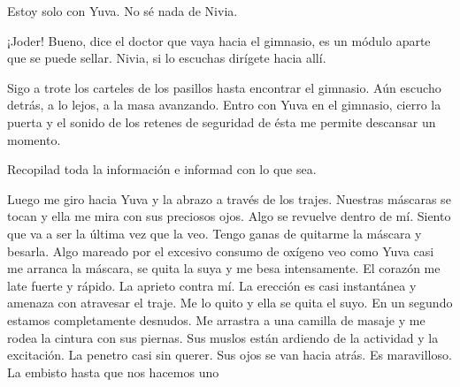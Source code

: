 \reply Estoy solo con Yuva. No sé nada de Nivia.

\reply ¡Joder\textellipsis! Bueno, dice el doctor que vaya hacia el gimnasio, es un módulo aparte que se puede sellar. Nivia, si lo escuchas dirígete hacia allí.

Sigo a trote los carteles de los pasillos hasta encontrar el gimnasio. Aún escucho detrás, a lo lejos, a la masa avanzando. Entro con Yuva en el gimnasio, cierro la puerta y el sonido de los retenes de seguridad de ésta me permite descansar un momento.

\reply Recopilad toda la información e informad con lo que sea.

Luego me giro hacia Yuva y la abrazo a través de los trajes. Nuestras máscaras se tocan y ella me mira con sus preciosos ojos. Algo se revuelve dentro de mí. Siento que va a ser la última vez que la veo. Tengo ganas de quitarme la máscara y besarla. Algo mareado por el excesivo consumo de oxígeno veo como Yuva casi me arranca la máscara, se quita la suya y me besa intensamente. El corazón me late fuerte y rápido. La aprieto contra mí. La erección es casi instantánea y amenaza con atravesar el traje. Me lo quito y ella se quita el suyo. En un segundo estamos completamente desnudos. Me arrastra a una camilla de masaje y me rodea la cintura con sus piernas. Sus muslos están ardiendo de la actividad y la excitación. La penetro casi sin querer. Sus ojos se van hacia atrás. Es maravilloso. La embisto hasta que nos hacemos uno\textellipsis